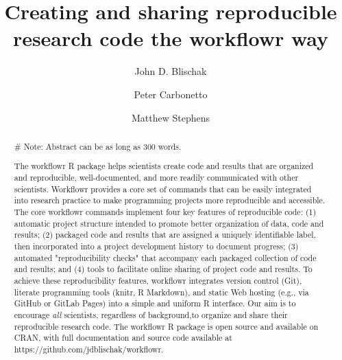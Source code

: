 \documentclass[9pt,a4paper]{extarticle}
\begin{document}
\pagestyle{front}

\title{Creating and sharing reproducible research code the workflowr
way}

\author[1]{John D. Blischak}

\author[1,2]{Peter Carbonetto}

\author[1,3]{Matthew Stephens}




\maketitle

\thispagestyle{front}

\begin{abstract}

\# Note: Abstract can be as long as 300 words.

The workflowr R package helps scientists create code and results that
are organized and reproducible, well-documented, and more readily
communicated with other scientists. Workflowr provides a core set of
commands that can be easily integrated into research practice to make
programming projects more reproducible and accessible. The core
workflowr commands implement four key features of reproducible code: (1)
automatic project structure intended to promote better organization of
data, code and results; (2) packaged code and results that are assigned
a uniquely identifiable label, then incorporated into a project
development history to document progress; (3) automated "reproducibility
checks" that accompany each packaged collection of code and results; and
(4) tools to facilitate online sharing of project code and results. To
achieve these reproducibility features, workflowr integrates version
control (Git), literate programming tools (knitr, R Markdown), and
static Web hosting (e.g., via GitHub or GitLab Pages) into a simple and
uniform R interface. Our aim is to encourage \textit{all} scientists,
regardless of background,to organize and share their reproducible
research code. The workflowr R package is open source and available on
CRAN, with full documentation and source code available at
https://github.com/jdblischak/workflowr.

\end{abstract}
\end{document}
